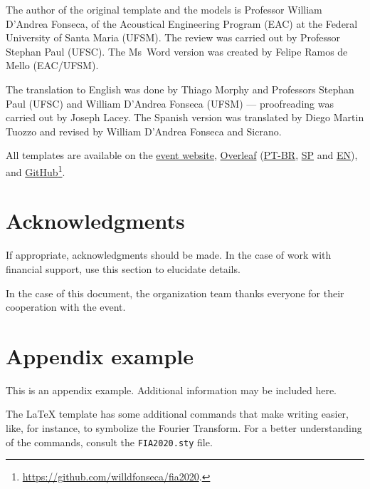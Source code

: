 \documentclass[12pt, a4paper, twoside, twocolumn]{article}
\begin{document}
The author of the original template and the models is Professor William D'Andrea Fonseca, of the Acoustical Engineering Program (EAC) at the Federal University of Santa Maria (UFSM). 
%
The review was carried out by Professor Stephan Paul (UFSC).
%
The Ms~Word version was created by Felipe Ramos de Mello (EAC/UFSM).

The translation to English was done by Thiago Morphy and Professors Stephan Paul (UFSC) and William D'Andrea Fonseca (UFSM) --- proofreading was carried out by Joseph Lacey.
%
The Spanish version was translated by Diego Martin Tuozzo and revised by William D'Andrea Fonseca and Sicrano.


All templates are available on the \href{http://www.fia2022.com.br}{event website}, \href{https://www.overleaf.com/read/hgryywpgmxdx}{Overleaf} (\href{https://www.overleaf.com/read/rnfjxkknksnd}{PT-BR}, \href{https://www.overleaf.com/read/rszcxtwshzfr}{SP} and \href{https://www.overleaf.com/read/hgryywpgmxdx}{EN}),  and \href{https://github.com/willdfonseca/fia2020}{GitHub}\footnote{\url{https://github.com/willdfonseca/fia2020}.}.

\section{Acknowledgments}

If appropriate, acknowledgments should be made. In the case of work with financial support, use this section to elucidate details.

In the case of this document, the organization team thanks everyone for their cooperation with the event.

\renewcommand{\refname}{References} 
 
{\fontrefs }
\appendix
\section{Appendix example}

This is an appendix example. Additional information may be included here.

The \LaTeX\xspace template has some additional commands that make writing easier, like, for instance, \F\xspace to symbolize the Fourier Transform. For a better understanding of the commands, consult the \texttt{FIA2020.sty} file.
\end{document}
